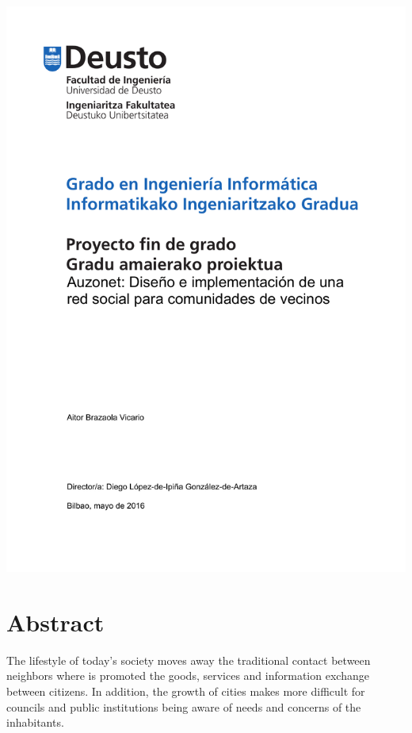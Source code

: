 \documentclass{DeustoFDP}
\begin{document}
\frontmatter
\pagestyle{plain}

\begin{titlepage}
    \includegraphics{fig/portada}
    \restoregeometry
\end{titlepage}
\cleardoublepage

\setcounter{page}{3}

\chapter*{Abstract}
The lifestyle of today's society moves away the traditional contact between neighbors
where is promoted the goods, services and information exchange between citizens. In addition, the growth of cities makes more difficult for councils and public institutions being aware of needs and concerns of the inhabitants.
\end{document}
